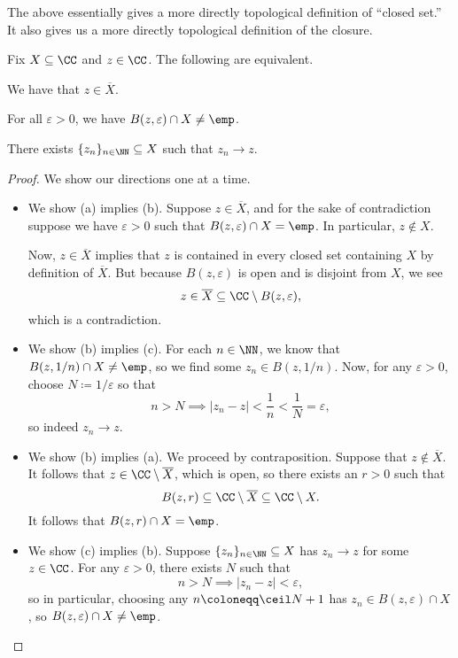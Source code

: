 \documentclass[../notes.tex]{subfiles}
\begin{document}
The above essentially gives a more directly topological definition of ``closed set.'' It also gives us a more directly topological definition of the closure.
\begin{lemma}
	Fix $X\subseteq\CC$ and $z\in\CC$. The following are equivalent.
	\begin{listalph}
		\item We have that $z\in\overline X$.
		\item For all $\varepsilon>0$, we have $B(z,\varepsilon)\cap X\ne\emp$.
		\item There exists $\{z_n\}_{n\in\NN}\subseteq X$ such that $z_n\to z$.
	\end{listalph}
\end{lemma}
\begin{proof}
	We show our directions one at a time.
	\begin{itemize}
		\item We show (a) implies (b). Suppose $z\in\overline X$, and for the sake of contradiction suppose we have $\varepsilon>0$ such that $B(z,\varepsilon)\cap X=\emp$. In particular, $z\notin X$.

		Now, $z\in\overline X$ implies that $z$ is contained in every closed set containing $X$ by definition of $\overline X$. But because $B(z,\varepsilon)$ is open and is disjoint from $X$, we see
		\[z\in\overline X\subseteq\CC\setminus B(z,\varepsilon),\]
		which is a contradiction.
		\item We show (b) implies (c). For each $n\in\NN$, we know that $B(z,1/n)\cap X\ne\emp$, so we find some $z_n\in B(z,1/n)$. Now, for any $\varepsilon>0$, choose $N\coloneqq 1/\varepsilon$ so that
		\[n>N\implies|z_n-z|<\frac1n<\frac1N=\varepsilon,\]
		so indeed $z_n\to z$.

		\item We show (b) implies (a). We proceed by contraposition. Suppose that $z\notin\overline X$. It follows that $z\in\CC\setminus\overline X$, which is open, so there exists an $r>0$ such that
		\[B(z,r)\subseteq\CC\setminus\overline X\subseteq\CC\setminus X.\]
		It follows that $B(z,r)\cap X=\emp$.

		\item We show (c) implies (b). Suppose $\{z_n\}_{n\in\NN}\subseteq X$ has $z_n\to z$ for some $z\in\CC$. For any $\varepsilon>0$, there exists $N$ such that
		\[n>N\implies|z_n-z|<\varepsilon,\]
		so in particular, choosing any $n\coloneqq \ceil N+1$ has $z_n\in B(z,\varepsilon)\cap X$, so $B(z,\varepsilon)\cap X\ne\emp$.
		\qedhere
	\end{itemize}
\end{proof}
\end{document}
